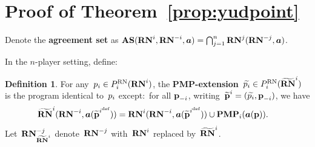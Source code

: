 \documentclass[sigconf]{aamas}
\theoremstyle{definition}
\newtheorem{definition}{Definition} %
\begin{document}
\section{Proof of Theorem~\ref{prop:yudpoint} }

Denote 
the \textbf{agreement set} as 
     $\textbf{AS}(\mathbf{RN}^{i}, \mathbf{RN}^{-i}, \boldsymbol{a}) = \bigcap_{j=1}^{n} \mathbf{RN}^{j}(\mathbf{RN}^{-j}, \boldsymbol{a})$.

In the ${n}$-player setting, define:

\setcounter{definition}{6}
     \begin{definition}
For any~$p_i \in P_i^{\textnormal{RN}}(\mathbf{RN}^{i})$, the \textbf{PMP-extension}~$\widetilde{p_i} \in P_i^{\textnormal{RN}}({\widetilde{\mathbf{RN}}}^{i})$
    is the program
    identical to~$p_i$
    except:\
    for all $\textbf{p}_{-i}$,
    writing~${\widetilde{\textbf{p}}^i} = (\widetilde{p_i}, \textbf{p}_{-i})$,
    we have
    \begin{align*}
        {\widetilde{\mathbf{RN}}}^{i}(\mathbf{RN}^{-i}, \boldsymbol{a}({\widetilde{\textbf{p}}^{i^{\textnormal{def}}}})) &= \mathbf{RN}^{i}(\mathbf{RN}^{-i}, \boldsymbol{a}({\widetilde{\textbf{p}}^{i^{\textnormal{def}}}})) \cup \mathbf{PMP}_i(\boldsymbol{a}(\textbf{p})).
    \end{align*}
    Let~$\mathbf{RN}^{-j}_{{\widetilde{\mathbf{RN}}}^{i}}$ denote~$\mathbf{RN}^{-j}$ with~$\mathbf{RN}^{i}$ replaced by~${\widetilde{\mathbf{RN}}}^{i}$. 
\end{definition}
\end{document}
